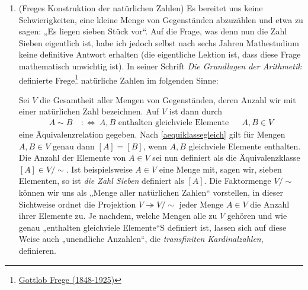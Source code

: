 \begin{bsp}[*] \label{bsp:lindenbaum} \quad
    \begin{enumerate}
        \item(Freges Konstruktion der natürlichen Zahlen) Es bereitet uns keine Schwierigkeiten, eine kleine Menge von Gegenständen abzuzählen und etwa zu sagen: „Es liegen sieben Stück vor“. Auf die Frage, was denn nun die Zahl Sieben eigentlich ist, habe ich jedoch selbst nach sechs Jahren Mathestudium keine definitive Antwort erhalten (die eigentliche Lektion ist, dass diese Frage mathematisch unwichtig ist). In seiner Schrift \emph{Die Grundlagen der Arithmetik} definierte Frege\footnote{\href{https://de.wikipedia.org/wiki/Gottlob_Frege}{Gottlob Frege (1848-1925)}} natürliche Zahlen im folgenden Sinne:

        Sei $V$ die Gesamtheit aller Mengen von Gegenständen, deren Anzahl wir mit einer natürlichen Zahl bezeichnen. Auf $V$ ist dann durch
        \begin{align*}
            A\sim B \ &:\Leftrightarrow\ \text{$A,B$ enthalten gleichviele Elemente} && A,B\in V
        \end{align*}
        eine Äquivalenzrelation gegeben. Nach \cref{aequiklassegleich} gilt für Mengen $A,B\in V$ genau dann $[A]=[B]$, wenn $A,B$ gleichviele Elemente enthalten. Die Anzahl der Elemente von $A\in V$ sei nun definiert als die Äquivalenzklasse $[A]\in V/{\sim}$. Ist beispielsweise $A\in V$ eine Menge mit, sagen wir, sieben Elementen, so ist \emph{die Zahl Sieben} definiert als $[A]$. Die Faktormenge $V/{\sim}$ können wir uns als „Menge aller natürlichen Zahlen“ vorstellen, in dieser Sichtweise ordnet die Projektion $V\twoheadrightarrow V/{\sim}$ jeder Menge $A\in V$ die Anzahl ihrer Elemente zu. Je nachdem, welche Mengen alle zu $V$ gehören und wie genau „enthalten gleichviele Elemente“S definiert ist, lassen sich auf diese Weise auch „unendliche Anzahlen“, die \emph{transfiniten Kardinalzahlen}, definieren.


\end{enumerate}
\end{bsp}
